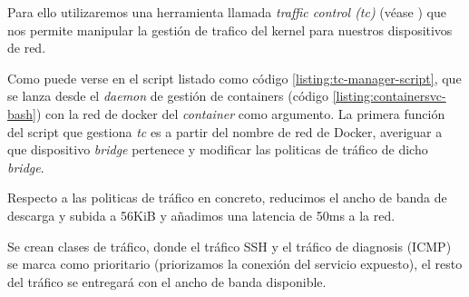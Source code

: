 Para ello utilizaremos una herramienta llamada \emph{traffic control (tc)} (véase \cite{man-tc}) que nos permite manipular la gestión de trafico del kernel
para nuestros dispositivos de red.

Como puede verse en el script listado como código \ref{listing:tc-manager-script}, que se lanza desde el \emph{daemon} de gestión de containers (código \ref{listing:containersvc-bash})
con la red de docker del \emph{container} como argumento. La primera función del script que gestiona \emph{tc} es a partir del
nombre de red de Docker, averiguar a que dispositivo \emph{bridge} pertenece y modificar las politicas de tráfico de dicho \emph{bridge}.

Respecto a las politicas de tráfico en concreto, reducimos el ancho de banda de descarga y subida a 56KiB y añadimos una latencia
de 50ms a la red. 

Se crean clases de tráfico, donde el tráfico SSH y el tráfico de diagnosis (ICMP) se marca como prioritario (priorizamos la conexión del servicio expuesto),
el resto del tráfico se entregará con el ancho de banda disponible.


